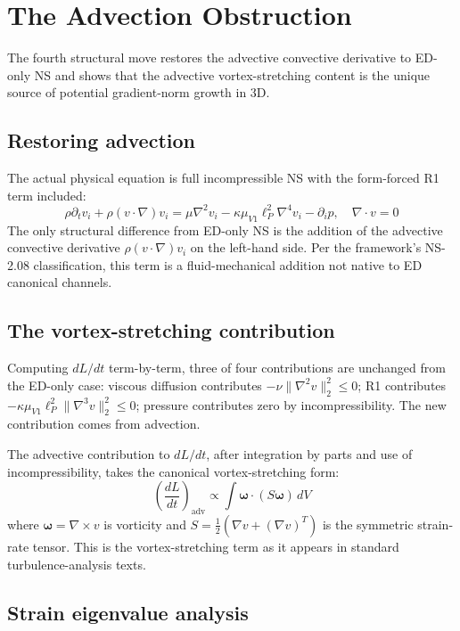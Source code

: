 \documentclass[11pt,a4paper]{article}
\begin{document}
\section{The Advection Obstruction}

The fourth structural move restores the advective convective derivative to ED-only NS and shows that the advective vortex-stretching content is the unique source of potential gradient-norm growth in 3D.

\subsection{Restoring advection}

The actual physical equation is full incompressible NS with the form-forced R1 term included:
\[
\rho\partial_t v_i + \rho(v\cdot\nabla)v_i = \mu\nabla^2 v_i - \kappa\mu_{V1}\ell_P^2\nabla^4 v_i - \partial_i p, \quad \nabla\cdot v = 0
\]
The only structural difference from ED-only NS is the addition of the advective convective derivative $\rho(v\cdot\nabla)v_i$ on the left-hand side. Per the framework's NS-2.08 classification, this term is a fluid-mechanical addition not native to ED canonical channels.

\subsection{The vortex-stretching contribution}

Computing $dL/dt$ term-by-term, three of four contributions are unchanged from the ED-only case: viscous diffusion contributes $-\nu\|\nabla^2 v\|^2_2 \leq 0$; R1 contributes $-\kappa\mu_{V1}\ell_P^2\|\nabla^3 v\|^2_2 \leq 0$; pressure contributes zero by incompressibility. The new contribution comes from advection.

The advective contribution to $dL/dt$, after integration by parts and use of incompressibility, takes the canonical vortex-stretching form:
\[
\left(\frac{dL}{dt}\right)_{\mathrm{adv}} \propto \int\boldsymbol{\omega}\cdot(S\boldsymbol{\omega})\, dV
\]
where $\boldsymbol{\omega} = \nabla\times v$ is vorticity and $S = \tfrac{1}{2}(\nabla v + (\nabla v)^T)$ is the symmetric strain-rate tensor. This is the vortex-stretching term as it appears in standard turbulence-analysis texts.

\subsection{Strain eigenvalue analysis}
\end{document}

